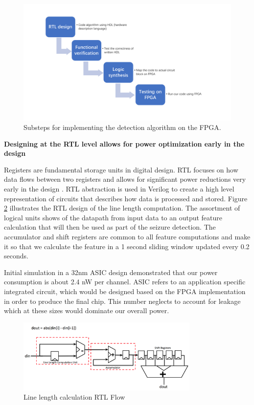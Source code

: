 \documentclass[usletter, 11pt]{extarticle}
\begin{document}
\begin{figure}[!ht]
	\centering
	\includegraphics[width = \textwidth]{img/HardwareDiagram_design_flow}
	\caption{Substeps for implementing the detection algorithm on the FPGA.}
	\label{fig:hardware_design_flow}
\end{figure}

\newpage
\vspace{11pt}
\textbf{Designing at the RTL level allows for power optimization early in the design}

Registers are fundamental storage units in digital design. RTL focuses on how data flows between two registers and allows for significant power reductions very early in the design \cite{najm1995}. RTL abstraction is used in Verilog to create a high level representation of circuits that describes how data is processed and stored. Figure \ref{fig:linelength_rtl} illustrates the RTL design of the line length computation. The assortment of logical units shows of the datapath from input data to an output feature calculation that will then be used as part of the seizure detection. The accumulator and shift registers are common to all feature computations and make it so that we calculate the feature in a 1 second sliding window updated every 0.2 seconds. 

Initial simulation in a 32nm ASIC design demonstrated that our power consumption is about 2.4 nW per channel. ASIC refers to an application specific integrated circuit, which would be designed based on the FPGA implementation in order to produce the final chip. This number neglects to account for leakage which at these sizes would dominate our overall power.

\begin{figure}[!h]
	\centering
	\includegraphics[width = 0.8\textwidth]{img/LL_RTL.png}
	\caption{Line length calculation RTL Flow} 
	\label{fig:linelength_rtl}
\end{figure}
\end{document}
